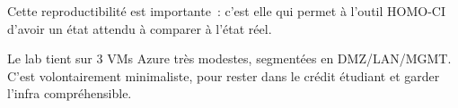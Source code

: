 Cette reproductibilité est importante~: c'est elle qui permet à
l'outil HOMO-CI d'avoir un état attendu à comparer à l'état réel.

\begin{takeaway}
Le lab tient sur 3 VMs Azure très modestes, segmentées en
DMZ/LAN/MGMT. C'est volontairement minimaliste, pour rester
dans le crédit étudiant et garder l'infra compréhensible.
\end{takeaway}
